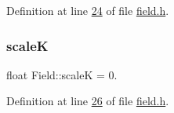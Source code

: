 Definition at line \hyperlink{a00074_source_l00024}{24} of file \hyperlink{a00074_source}{field.\+h}.

\mbox{\label{a00173_af59e50c5d976daa2af7f35f1f3ea2b7c}} 
\subsubsection{\texorpdfstring{scaleK}{scaleK}}
{\footnotesize\ttfamily float Field\+::scaleK = 0.\hspace{0.3cm}{\ttfamily [protected]}}



Definition at line \hyperlink{a00074_source_l00026}{26} of file \hyperlink{a00074_source}{field.\+h}.


